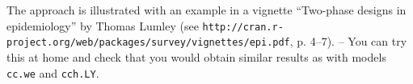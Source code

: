\begin{enumerate}[resume]
\begin{comment}
a call of function {\tt twophase()} with appropriate
arguments creates an object
 of class {\tt twophase}, named e.g. {\tt oc.2ph}, that
 contains the original data frame and all the survey design information
  (like weights) needed to analyse it.
After that, function {\tt svycoxph()}, which is  
a ``survey design version'' of {\tt coxph()}, 
is called with a similar model formula as before but in which,
instead of the {\tt data} argument, one would specify {\tt design = oc.2ph}.
\end{comment}
The approach is illustrated with an example
 in a vignette ``Two-phase designs in epidemiology'' by Thomas Lumley
(see {\tt http://cran.r-project.org/web/packages/survey/vignettes/epi.pdf}, p. 4--7).
-- You can try this at home and check that you would obtain similar results as
with models {\tt cc.we} and {\tt cch.LY}. 

\end{enumerate} %




